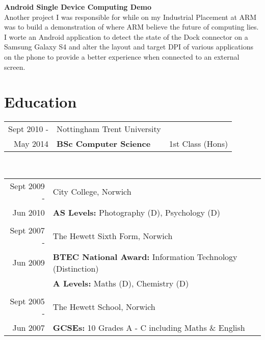 \documentclass[a4paper,10pt]{article} %
\begin{document}
\textbf{Android Single Device Computing Demo} \\
Another project I was responsible for while on my Industrial Placement at ARM was to build a demonstration of where ARM believe the future of computing lies. I worte an Android application to detect the state of the Dock connector on a Samsung Galaxy S4 and alter the layout and target DPI of various applications on the phone to provide a better experience when connected to an external screen. \\
\par

\section{Education}
\begin{tabular}{r|ll}
Sept 2010 -& Nottingham Trent University & \\
May 2014& \textbf{BSc Computer Science} & 1st Class (Hons) \\
\end{tabular} \\
\begin{tabular}{r|l}
Sept 2009 -& City College, Norwich \\
Jun 2010 & \textbf{AS Levels: }Photography (D), Psychology (D) \\
\multicolumn{2}{c}{} \\
Sept 2007 -& The Hewett Sixth Form, Norwich \\
Jun 2009 & \textbf{BTEC National Award: }Information Technology (Distinction) \\
& \textbf{A Levels: }Maths (D), Chemistry (D) \\
\multicolumn{2}{c}{} \\
Sept 2005 -& The Hewett School, Norwich \\
Jun 2007 & \textbf{GCSEs: }10 Grades A - C including Maths \& English \\
\end{tabular}
\end{document}
